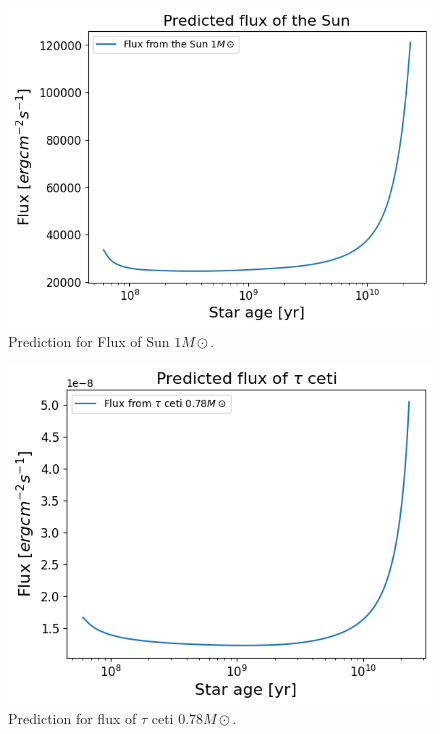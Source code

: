 \begin{figure}[H]
	\centering
	\includegraphics[width=\textwidth,height=0.35\textheight]{assets/fluxsun.png}
	\caption{Prediction for Flux of Sun $1 M\odot$.}
	\label{fig:predicted flux sun}
\end{figure}
\begin{figure}[H]
	\centering
	\includegraphics[width=\textwidth,height=0.35\textheight]{assets/fluxtau.png}
	\caption{Prediction for flux of $\tau$ ceti $0.78 M\odot$.}
	\label{fig:predicted flux tau}
\end{figure}
